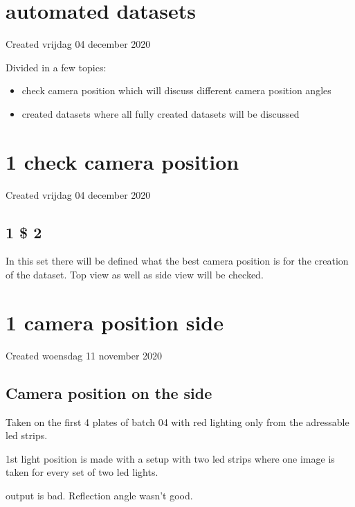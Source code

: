 		\section{automated datasets}

Created vrijdag 04 december 2020



Divided in a few topics:



\begin{itemize}
\item check camera position which will discuss different camera position angles
\item created datasets where all fully created datasets will be discussed
\end{itemize}

		\section{1 check camera position}

Created vrijdag 04 december 2020



\subsection{1 \$ 2}

In this set there will be defined what the best camera position is for the creation of the dataset. Top view as well as side view will be checked.


		\section{1 camera position side}

Created woensdag 11 november 2020



\subsection{Camera position on the side}

Taken on the first 4 plates of batch 04 with red lighting only from the adressable led strips. 



1st light position is made with a setup with two led strips where one image is taken for every set of two led lights. 

output is bad. Reflection angle wasn't good. 

